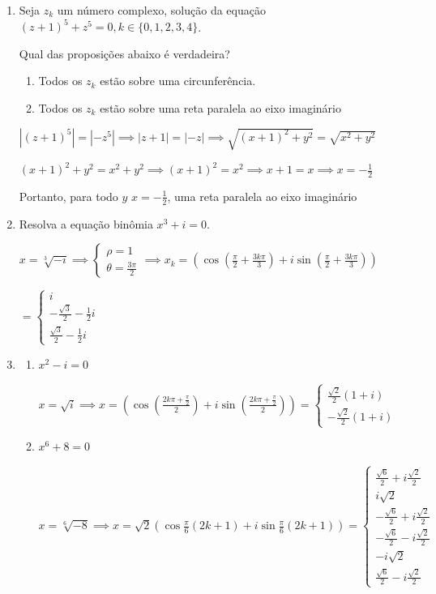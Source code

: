 \documentclass[12pt, openright, a4paper, twoside, english, brazil]{article}
\newenvironment{qitem}{
  \color{black}
\item}{\vspace{10pt}}
\newenvironment{qmitem}{
  \color{black}
\item
\begin{enumerate}[\bfseries a)]}{
\end{enumerate}\vspace{10pt}}
\newcommand{\cis}[1]{\displaystyle(\cos#1+i\sin#1)}
\begin{document}
\begin{enumerate}[\bfseries 1.]
\begin{qitem} %
  Seja $z_k$ um número complexo, solução da equação $(z+1)^5+z^5=0,
  k\in\{0,1,2,3,4\}$.

  Qual das proposições abaixo é verdadeira?

\begin{enumerate}[\bfseries a) ]
  \item Todos os $z_k$ estão sobre uma circunferência.
  \item Todos os $z_k$ estão sobre uma reta paralela ao eixo imaginário
\end{enumerate}

\color{red}

$|(z+1)^5|=|-z^5|\implies |z+1|=|-z|\implies \sqrt{(x+1)^2+y^2}=\sqrt{x^2+y^2}$

$(x+1)^2+y^2=x^2+y^2\implies (x+1)^2=x^2\implies x+1=x\implies x=-\frac12$

Portanto, para todo $y$ $x=-\frac12$, uma reta paralela ao eixo imaginário

\end{qitem}

\begin{qitem} %
Resolva a equação binômia $x^3+i=0$.

\color{red}
$x=\sqrt[3]{-i}\implies
\begin{cases}\rho=1\\\theta=\frac{3\pi}{2}
\end{cases}\implies x_k=\cis{\left(\frac{\pi}{2}+\frac{3k\pi}{3}\right)}$

$=
\begin{cases}i\\-\frac{\sqrt3}{2}-\frac12i\\\frac{\sqrt3}{2}-\frac12i
\end{cases}$
\end{qitem}

\begin{qmitem} %
\item $x^2-i=0$
\color{red}

$\displaystyle x=\sqrt{i}\implies x=\cis{\left(\frac{2k\pi+\frac
\pi2}{2}\right)}=
\begin{cases}\frac{\sqrt2}{2}(1+i)\\-\frac{\sqrt2}{2}(1+i)
\end{cases}$

\color{black}
\item $x^6+8=0$
\color{red}

$\displaystyle x=\sqrt[6]{-8}\implies x=\sqrt{2}\cis{\frac{\pi}{6}(2k+1)}=
\begin{cases}\frac{\sqrt6}{2}+i\frac{\sqrt2}{2}\\i\sqrt2\\-\frac{\sqrt6}{2}+i\frac{\sqrt2}{2}\\-\frac{\sqrt6}{2}-i\frac{\sqrt2}{2}\\-i\sqrt2\\\frac{\sqrt6}{2}-i\frac{\sqrt2}{2}
\end{cases}$


\end{qmitem}
\end{enumerate}
\end{document}
